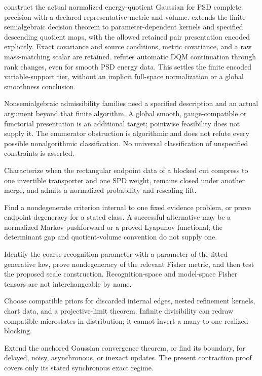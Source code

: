 \begin{description}
construct the actual normalized energy-quotient Gaussian for PSD complete
precision with a declared representative metric and volume.
 extends the finite
semialgebraic decision theorem to parameter-dependent kernels and
specified descending quotient maps, with the allowed retained pair
presentation encoded explicitly. Exact covariance and source conditions,
metric covariance, and a raw mass-matching scalar are retained.
 refutes automatic
DQM continuation through rank changes, even for smooth PSD energy data.
This settles the finite encoded variable-support tier, without an implicit
full-space normalization or a global smoothness conclusion.

Nonsemialgebraic admissibility families need a specified description and
an actual argument beyond that finite algorithm. A global smooth,
gauge-compatible or functorial presentation is an additional target;
pointwise feasibility does not supply it. The enumerator obstruction
is algorithmic and does not refute every possible nonalgorithmic
classification. No universal classification of unspecified constraints
is asserted. 

\item[Nonflat-link compression (open).]
Characterize when the rectangular endpoint data of a blocked cut
compress to one invertible transporter and one SPD weight, remains closed
under another merge, and admits a normalized probability and rescaling lift.

\item[Intrinsic scale selection (open).]
Find a nondegenerate criterion internal to one fixed evidence problem, or
prove endpoint degeneracy for a stated class.  A successful alternative may
be a normalized Markov pushforward or a proved Lyapunov functional; the
determinant gap and quotient-volume convention do not supply one. 

\item[Information-geometric transfer (open).]
Identify the coarse recognition parameter with a parameter of the fitted
generative law, prove nondegeneracy of the relevant Fisher metric, and then
test the proposed scale construction.  Recognition-space and model-space
Fisher tensors are not interchangeable by name. 

\item[Stochastic inverse RG (open).]
Choose compatible priors for discarded internal edges, nested refinement
kernels, chart data, and a projective-limit theorem.  Infinite divisibility
can redraw compatible microstates in distribution; it cannot invert a
many-to-one realized blocking. 

\item[Update robustness (open).]
Extend the anchored Gaussian convergence theorem, or find its boundary, for
delayed, noisy, asynchronous, or inexact updates.  The present contraction
proof covers only its stated synchronous exact regime. 
\end{description}

